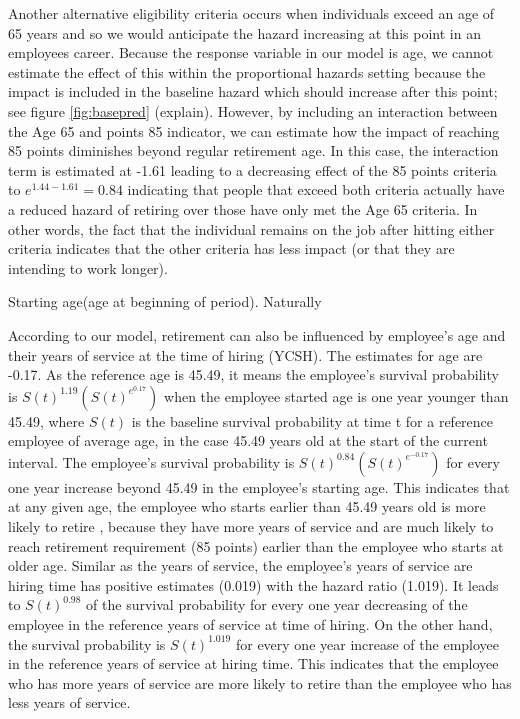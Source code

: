 \documentclass[12pt,letterpaper]{article}
\begin{document}
\begin{enumerate}
\begin{table}[htbp]
\begin{threeparttable}
	\end{threeparttable}
	\label{tab:paraest.}%
\end{table}%

Another alternative eligibility criteria occurs when individuals exceed an age of 65 years and so we would anticipate the hazard increasing at this point in an employees career.  Because the response variable in our model is age, we cannot estimate the effect of this within the proportional hazards setting because the impact is included in the baseline hazard which should increase after this point; see figure \ref{fig:basepred} (explain).  However, by including an interaction between the Age 65 and points 85 indicator, we can estimate how the impact of reaching 85 points diminishes beyond regular retirement age.  In this case, the interaction term is estimated at -1.61 leading to a decreasing effect of the 85 points criteria to $e^{1.44-1.61} = 0.84$ indicating that people that exceed both criteria actually have a reduced hazard of retiring over those have only met the Age 65 criteria.  In other words, the fact that the individual remains on the job after hitting either criteria indicates that the other criteria has less impact (or that they are intending to work longer).


Starting age(age at beginning of period).  Naturally

According to our model, retirement can also be influenced by employee's age and their years of service at the time of hiring (YCSH).  The estimates for age are -0.17. As the reference age is 45.49, it means the employee's survival probability is $S(t)^{1.19}(S(t)^{e^{0.17}})$ when the employee started age is one year younger than 45.49,  where $S(t)$ is the baseline survival probability at time t for a reference employee of average age, in the case 45.49 years old at the start of the current interval. The employee's survival probability is $S(t)^{0.84}(S(t)^{e^{-0.17}})$ for every one year increase beyond 45.49 in the employee's starting age. This indicates that at any given age, the employee who starts earlier than 45.49 years old is more likely to retire , because they have more years of service and are much likely to reach retirement requirement (85 points) earlier than the employee who starts at older age. Similar as the years of service, the employee's years of service are hiring time has positive estimates (0.019) with the hazard ratio (1.019). It leads to $S(t)^{0.98}$ of the survival probability for every one year decreasing of the employee in the reference years of service at time of hiring. On the other hand, the survival probability is $S(t)^{1.019}$ for every one year increase of the employee in the reference years of service at hiring time. This indicates that the employee who has more years of service are more likely to retire than the employee who has less years of service.



\end{enumerate}
\end{document}
